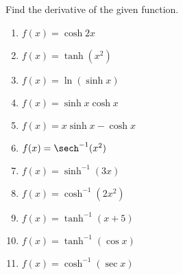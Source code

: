 \begin{enumialphparenastyle}
\begin{ex}
\begin{sol}
	\end{sol}
\end{ex}

\begin{ex}
Find the derivative of the given function.
\begin{enumerate}
\item {$f(x) = \cosh 2x$}

\item {$f(x) = \tanh (x^2)$}

\item {$f(x) = \ln(\sinh x)$}

\item {$f(x) = \sinh x\cosh x$}

\item {$f(x) = x\sinh x-\cosh x$}

\item {$f(x) = \sech^{-1} (x^2)$}

\item {$f(x) = \sinh^{-1} (3x)$}

\item {$f(x) = \cosh^{-1} (2x^2)$}

\item {$f(x) = \tanh^{-1} (x+5)$}

\item {$f(x) = \tanh^{-1} (\cos x)$}

\item {$f(x) = \cosh^{-1} (\sec x)$}


\end{enumerate}
\end{ex}
\end{enumialphparenastyle}
